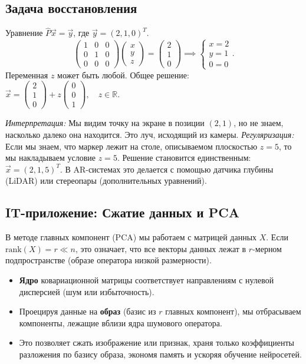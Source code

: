 \documentclass[a4paper,12pt]{article}
\begin{document}
\subsection{Задача восстановления}
Уравнение $\hat{P}\vec{x} = \vec{y}$, где $\vec{y}=(2,1,0)^T$.
\[
\begin{pmatrix} 1 & 0 & 0 \\ 0 & 1 & 0 \\ 0 & 0 & 0 \end{pmatrix} \begin{pmatrix} x \\ y \\ z \end{pmatrix} = \begin{pmatrix} 2 \\ 1 \\ 0 \end{pmatrix} \implies \begin{cases} x=2 \\ y=1 \\ 0=0 \end{cases}.
\]
Переменная $z$ может быть любой.
Общее решение: $\vec{x} = \begin{pmatrix} 2 \\ 1 \\ 0 \end{pmatrix} + z \begin{pmatrix} 0 \\ 0 \\ 1 \end{pmatrix}, \quad z \in \mathbb{R}$.

\textit{Интерпретация:} Мы видим точку на экране в позиции $(2,1)$, но не знаем, насколько далеко она находится. Это луч, исходящий из камеры.
\textit{Регуляризация:} Если мы знаем, что маркер лежит на столе, описываемом плоскостью $z=5$, то мы накладываем условие $z=5$. Решение становится единственным: $\vec{x} = (2, 1, 5)^T$. В AR-системах это делается с помощью датчика глубины (LiDAR) или стереопары (дополнительных уравнений).

\subsection{IT-приложение: Сжатие данных и PCA}
В методе главных компонент (PCA) мы работаем с матрицей данных $X$. Если $\text{rank}(X) = r \ll n$, это означает, что все векторы данных лежат в $r$-мерном подпространстве (образе оператора низкой размерности).
\begin{itemize}
    \item \textbf{Ядро} ковариационной матрицы соответствует направлениям с нулевой дисперсией (шум или избыточность).
    \item Проецируя данные на \textbf{образ} (базис из $r$ главных компонент), мы отбрасываем компоненты, лежащие вблизи ядра шумового оператора.
    \item Это позволяет сжать изображение или признак, храня только коэффициенты разложения по базису образа, экономя память и ускоряя обучение нейросетей.
\end{itemize}
\end{document}
